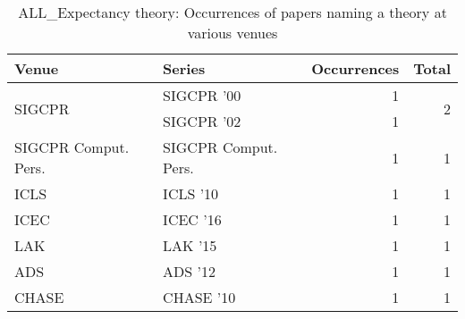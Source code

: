 \begin{table*}[t]
\begin{tabular}{llrr}
Venue & Series & Occurrences & Total\\\hline
\multirow{2}{*}{SIGCPR } & SIGCPR '00 & 1 & \multirow{2}{*}{2}\\
& SIGCPR '02 & 1 &\\
\multirow{1}{*}{SIGCPR Comput. Pers.} & SIGCPR Comput. Pers. & 1 & \multirow{1}{*}{1}\\
\multirow{1}{*}{ICLS } & ICLS '10 & 1 & \multirow{1}{*}{1}\\
\multirow{1}{*}{ICEC } & ICEC '16 & 1 & \multirow{1}{*}{1}\\
\multirow{1}{*}{LAK } & LAK '15 & 1 & \multirow{1}{*}{1}\\
\multirow{1}{*}{ADS } & ADS '12 & 1 & \multirow{1}{*}{1}\\
\multirow{1}{*}{CHASE } & CHASE '10 & 1 & \multirow{1}{*}{1}\\
\end{tabular}
\caption{ALL\_Expectancy theory: Occurrences of papers naming a theory at various venues}
\end{table*}